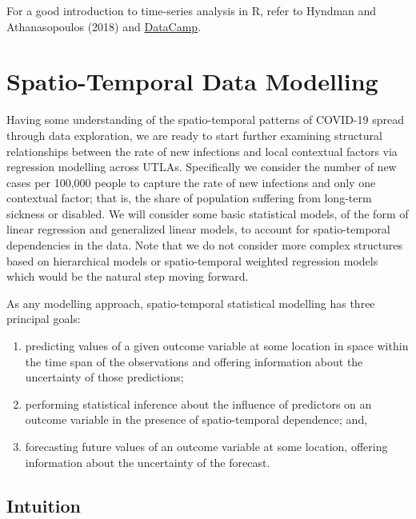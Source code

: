\documentclass[
  letterpaper,
  krantz2]{style/krantz}
\begin{document}
For a good introduction to time-series analysis in R, refer to Hyndman
and Athanasopoulos (2018) and
\href{https://www.datacamp.com/courses/forecasting-using-r}{DataCamp}.

\hypertarget{spatio-temporal-data-modelling}{%
\section{Spatio-Temporal Data
Modelling}\label{spatio-temporal-data-modelling}}

Having some understanding of the spatio-temporal patterns of COVID-19
spread through data exploration, we are ready to start further examining
structural relationships between the rate of new infections and local
contextual factors via regression modelling across UTLAs. Specifically
we consider the number of new cases per 100,000 people to capture the
rate of new infections and only one contextual factor; that is, the
share of population suffering from long-term sickness or disabled. We
will consider some basic statistical models, of the form of linear
regression and generalized linear models, to account for spatio-temporal
dependencies in the data. Note that we do not consider more complex
structures based on hierarchical models or spatio-temporal weighted
regression models which would be the natural step moving forward.

As any modelling approach, spatio-temporal statistical modelling has
three principal goals:

\begin{enumerate}
\def\labelenumi{\arabic{enumi}.}
\item
  predicting values of a given outcome variable at some location in
  space within the time span of the observations and offering
  information about the uncertainty of those predictions;
\item
  performing statistical inference about the influence of predictors on
  an outcome variable in the presence of spatio-temporal dependence;
  and,
\item
  forecasting future values of an outcome variable at some location,
  offering information about the uncertainty of the forecast.
\end{enumerate}

\hypertarget{intuition}{%
\subsection{Intuition}\label{intuition}}
\end{document}

